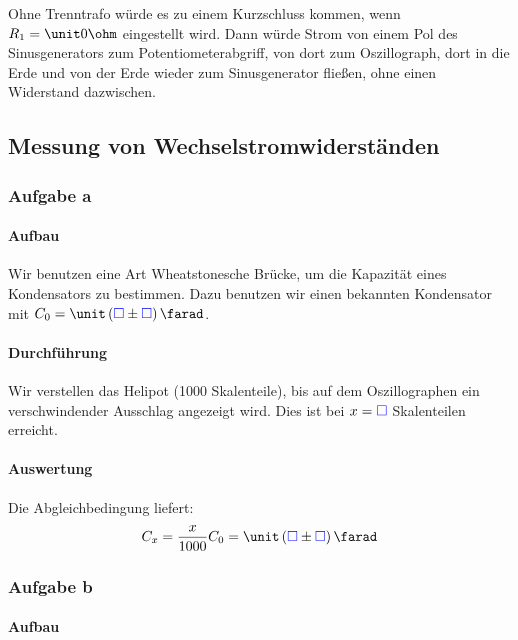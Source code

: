 \documentclass[11pt, ngerman]{article}
\newcommand{\emesswert}{\left(\messwert \pm \messwert \right)}
\newcommand{\messwert}{\textcolor{blue}{\square}}
\begin{document}
Ohne Trenntrafo würde es zu einem Kurzschluss kommen, wenn $R_1 = \unit0\ohm$
eingestellt wird. Dann würde Strom von einem Pol des Sinusgenerators zum
Potentiometerabgriff, von dort zum Oszillograph, dort in die Erde und von der
Erde wieder zum Sinusgenerator fließen, ohne einen Widerstand dazwischen.

\subsection{Messung von Wechselstromwiderständen}

\subsubsection{Aufgabe a}

\label{Aufgabe a}

\paragraph{Aufbau}

Wir benutzen eine Art Wheatstonesche Brücke, um die Kapazität eines
Kondensators zu bestimmen. Dazu benutzen wir einen bekannten Kondensator mit
$C_0 = \unit \emesswert \farad$.

\paragraph{Durchführung}

Wir verstellen das Helipot (1000 Skalenteile), bis auf dem Oszillographen ein
verschwindender Ausschlag angezeigt wird. Dies ist bei $x = \messwert$
Skalenteilen erreicht.

\paragraph{Auswertung}

Die Abgleichbedingung liefert:
\begin{equation}
	\label{eq:a}
	C_x = \frac{x}{1000} C_0 = \unit \emesswert \farad
\end{equation}

\subsubsection{Aufgabe b}

\label{Aufgabe b}

\paragraph{Aufbau}
\end{document}
